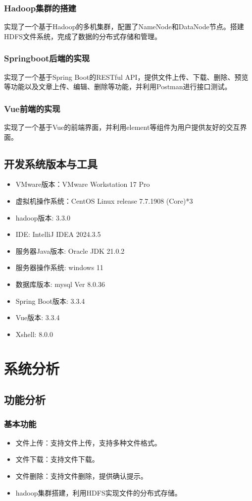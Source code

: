 \documentclass[bachelor]{thesis-uestc}
\begin{document}
\subsection{Hadoop集群的搭建}
实现了一个基于Hadoop的多机集群，配置了NameNode和DataNode节点。搭建HDFS文件系统，完成了数据的分布式存储和管理。
\subsection{Springboot后端的实现}
实现了一个基于Spring Boot的RESTful API，提供文件上传、下载、删除、预览等功能以及文章上传、编辑、删除等功能，并利用Postman进行接口测试。
\subsection{Vue前端的实现}
实现了一个基于Vue的前端界面，并利用element等组件为用户提供友好的交互界面。


\section{开发系统版本与工具}

\begin{itemize}
\item VMware版本：VMware Workstation 17 Pro
\item 虚拟机操作系统：CentOS Linux release 7.7.1908 (Core)*3
\item hadoop版本: 3.3.0
\item IDE: IntelliJ IDEA 2024.3.5
\item 服务器Java版本: Oracle JDK 21.0.2
\item 服务器操作系统: windows 11
\item 数据库版本: mysql Ver 8.0.36
\item Spring Boot版本: 3.3.4
\item Vue版本: 3.3.4
\item Xshell: 8.0.0
\end{itemize}

\chapter{系统分析}


\section{功能分析}
\subsection{基本功能}
\begin{itemize}
    \item 文件上传：支持文件上传，支持多种文件格式。
    \item 文件下载：支持文件下载。
    \item 文件删除：支持文件删除，提供确认提示。
    \item hadoop集群搭建，利用HDFS实现文件的分布式存储。
\end{itemize}
\end{document}
